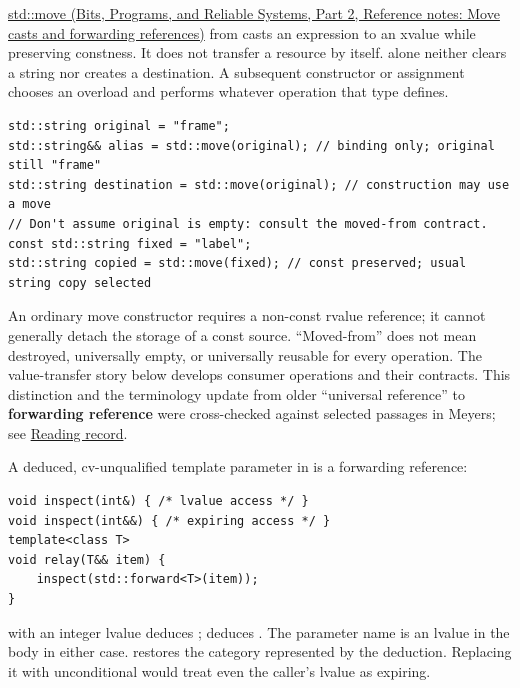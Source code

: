 \hypertarget{05-engine-i-ch003-move-permission-is-not-resource-transfer}{}

\href{../01-Bits-Programs-and-Reliable-Systems-P02/main.pdf\#appendix-0104b704fb11}{std::move (Bits, Programs, and Reliable Systems, Part 2, Reference notes: Move casts and forwarding references)} from  casts an expression to an xvalue while preserving constness. It does not transfer a resource by itself.  alone neither clears a string nor creates a destination. A subsequent constructor or assignment chooses an overload and performs whatever operation that type defines.

\begin{verbatim}
std::string original = "frame";
std::string&& alias = std::move(original); // binding only; original still "frame"
std::string destination = std::move(original); // construction may use a move
// Don't assume original is empty: consult the moved-from contract.
const std::string fixed = "label";
std::string copied = std::move(fixed); // const preserved; usual string copy selected
\end{verbatim}

An ordinary  move constructor requires a non-const rvalue reference; it cannot generally detach the storage of a const source. ``Moved-from'' does not mean destroyed, universally empty, or universally reusable for every operation. The value-transfer story below develops consumer operations and their contracts. This distinction and the terminology update from older ``universal reference'' to \textbf{forwarding reference} were cross-checked against selected passages in Meyers; see \hyperref[appendix-a103e7846d21-m008---borrowing-categories-and-const-access]{Reading record}.

A deduced, cv-unqualified template parameter in  is a forwarding reference:

\begin{verbatim}
void inspect(int&) { /* lvalue access */ }
void inspect(int&&) { /* expiring access */ }
template<class T>
void relay(T&& item) {
    inspect(std::forward<T>(item));
}
\end{verbatim}

 with an integer lvalue deduces ;  deduces . The parameter name  is an lvalue in the body in either case.  restores the category represented by the deduction. Replacing it with unconditional  would treat even the caller's lvalue as expiring.

